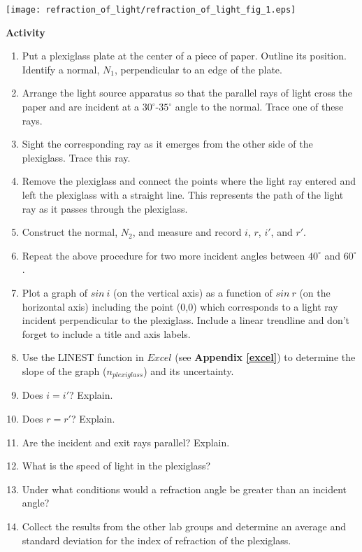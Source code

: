 {\centering \texttt{[image: refraction\_of\_light/refraction\_of\_light\_fig\_1.eps]} \par}


\pagebreak[2]
\textbf{Activity} 

\begin{enumerate}[labparts]
\item Put a plexiglass plate at the center of a piece of paper. Outline
its position. Identify a normal, $N_1$, perpendicular to an edge of
the plate.
\item Arrange the light source apparatus so that the parallel rays of light
cross the paper and are incident at a $30^\circ$-$35^\circ$ angle
to the normal. Trace one of these rays.
\item Sight the corresponding ray as it emerges from the other side of the
plexiglass. Trace this ray.
\item Remove the plexiglass and connect the points where the light ray entered 
and left the plexiglass with a straight line. This represents the path of the 
light ray as it passes through the plexiglass.
\item Construct the normal, $N_2$, and measure and record $i$, $r$, $i'$, and $r'$. 
\answerspace{20mm}

\item Repeat the above procedure for two more incident angles between
$40^\circ$ and $60^\circ$. \vspace{30mm}
\item Plot a graph of $sin~i$ (on the vertical axis) as a function of $sin~r$ 
(on the horizontal axis) including the point (0,0) which corresponds to a 
light ray incident perpendicular to the plexiglass. Include a linear trendline 
and don't forget to include a title and axis labels.
\item Use the LINEST function in $Excel$ (see \textbf{Appendix \ref{excel}}) to 
determine the slope of the graph ($n_{plexiglass}$) and its uncertainty.
\vspace{25mm}

\item Does $i = i'$? Explain.\answerspace{20mm}

\item Does $r = r'$? Explain.\answerspace{20mm}

\item Are the incident and exit rays parallel? Explain.\answerspace{20mm}

\item What is the speed of light in the plexiglass?\answerspace{25mm}

\item Under what conditions would a refraction angle be greater than an
incident angle?\answerspace{25mm}
\item Collect the results from the other lab groups and determine an average 
and standard deviation for the index of refraction of the plexiglass.
\end{enumerate}

